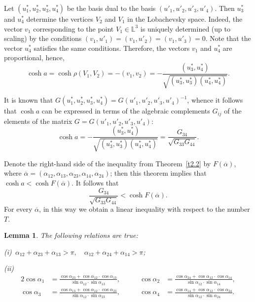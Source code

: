 \documentclass[reqno,12pt]{amsart}
\newtheorem{lemma}{\indent Lemma}%
\begin{document}
Let $(u^*_1, u^*_2, u^*_3, u^*_4)$ be the basis dual to the basis $(u'_1,
u'_2, u'_3, u'_4)$. Then $u^*_3$ and $u^*_4$ determine the vertices $V_2$ and $V_1$ in the Lobachevsky space.
Indeed, the vector $v_1$ corresponding to the point
$V_1 \in \mathbb{L}^3$ is uniquely determined (up to scaling)  by the conditions
$(v_1, u'_1)=(v_1, u'_2)=(v_1, u'_3)=0$. Note that
the vector $u_4^*$ satisfies the same conditions. Therefore, the vectors $v_1$ and
$u^*_4$ are proportional, hence,
$$
\cosh a=\cosh \rho(V_1, V_2)=-(v_1, v_2)=-\frac{(u_3^*,u_4^*)}
{\sqrt{(u_3^*,u_3^*)(u_4^*,u_4^*)}}.
$$

It is known that $G(u^*_1, u^*_2, u^*_3, u^*_4)=G(u'_1, u'_2, u'_3, u'_4)^{-1}$,
whence it follows that $\cosh a$ can be expressed in terms of the algebraic complements
$G_{ij}$ of the elements of the matrix $G=G(u'_1, u'_2, u'_3, u'_4)$:
$$
\cosh a=-\frac{(u_3^*,u_4^*)}{\sqrt{(u_3^*,u_3^*)(u_4^*,u_4^*)}} =
\frac{G_{34}}{\sqrt{G_{33} G_{44}}}.
$$

Denote the right-hand side of the inequality from Theorem~\ref{t2.2} by $F(\overline
\alpha)$, where $\overline \alpha=(\alpha_{12}, \alpha_{13}, \alpha_{23},
\alpha_{14}, \alpha_{24})$; then this theorem implies that $\cosh
a < \cosh F(\overline \alpha)$. It follows that
\begin{equation}
\label{eq5}
\frac{G_{34}}{\sqrt{G_{33} G_{44}}} < \cosh F(\overline \alpha).
\end{equation}
For every $\overline \alpha$, in this way we obtain  a linear inequality
with respect to the number $T$.

\begin{lemma}
\label{l2.1}
The following relations are true:

{\rm(i)}~$\alpha_{12}+\alpha_{23}+\alpha_{13} > \pi,
\quad \alpha_{12}+\alpha_{24}+\alpha_{14} > \pi$;

{\rm(ii)}
\begin{alignat*}{2}
\cos \alpha_1&=\frac{\cos \alpha_{23}+\cos \alpha_{12} \cdot \cos \alpha_{13}}
{\sin \alpha_{12} \cdot \sin \alpha_{13}}, &\qquad
\cos \alpha_2&=\frac{\cos \alpha_{24}+\cos \alpha_{12} \cdot \cos \alpha_{14}}
{\sin \alpha_{12} \cdot \sin \alpha_{14}},
\\
\cos \alpha_3&=\frac{\cos \alpha_{13}+\cos \alpha_{12} \cdot \cos \alpha_{23}}
{\sin \alpha_{12} \cdot \sin \alpha_{23}}, &\qquad
\cos \alpha_4&=\frac{\cos \alpha_{14}+\cos \alpha_{12} \cdot \cos \alpha_{24}}
{\sin \alpha_{12} \cdot \sin \alpha_{24}}.
\end{alignat*}
\end{lemma}
\end{document}
